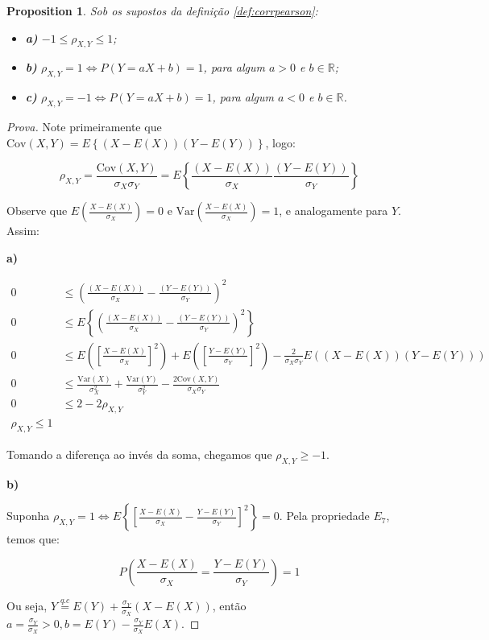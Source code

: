 \documentclass[
]{article}
\providecommand{\tightlist}{%
  \setlength{\itemsep}{0pt}\setlength{\parskip}{0pt}}
\newtheorem{proposition}{Proposition}[section]
\theoremstyle{definition}
\theoremstyle{definition}
\theoremstyle{definition}
\theoremstyle{definition}
\theoremstyle{remark}
\begin{document}
\begin{proposition}

Sob os supostos da definição \ref{def:corrpearson}:

\begin{itemize}
\tightlist
\item
  \textbf{a)} \(-1 \le \rho_{X,Y} \le 1\);
\item
  \textbf{b)} \(\rho_{X,Y} = 1 \Leftrightarrow P(Y = aX + b) = 1\), para algum \(a > 0\) e \(b \in \mathbb{R}\);
\item
  \textbf{c)} \(\rho_{X,Y} = -1 \Leftrightarrow P(Y = aX + b) = 1\), para algum \(a < 0\) e \(b \in \mathbb{R}\).
\end{itemize}

\end{proposition}

\begin{proof}[Prova]
Note primeiramente que \(\mathrm{Cov}(X,Y) = E\left\{(X - E(X))(Y - E(Y))\right\}\), logo:

\begin{equation*}
\rho_{X,Y} = \frac{\mathrm{Cov}(X,Y)}{\sigma_{X}\sigma_{Y}} = E\left\{\frac{(X - E(X))}{\sigma_{X}}\frac{(Y - E(Y))}{\sigma_{Y}}\right\}
\end{equation*}

Observe que \(E\left(\frac{X - E(X)}{\sigma_{X}}\right) = 0\) e \(\mathrm{Var}\left(\frac{X - E(X)}{\sigma_{X}}\right) = 1\), e analogamente para \(Y\). Assim:

\textbf{a)}

\begin{align*}
0 &\le \left(\frac{(X - E(X))}{\sigma_{X}} - \frac{(Y - E(Y))}{\sigma_{Y}}\right)^{2} \\
0 &\le E\left\{\left(\frac{(X - E(X))}{\sigma_{X}} - \frac{(Y - E(Y))}{\sigma_{Y}}\right)^{2}\right\} \\
0 &\le E\left(\left[\frac{X - E(X)}{\sigma_{X}}\right]^{2}\right) + E\left(\left[\frac{Y - E(Y)}{\sigma_{Y}}\right]^{2}\right) - \frac{2}{\sigma_{X}\sigma_{Y}}E((X - E(X))(Y - E(Y))) \\
0 &\le \frac{\mathrm{Var}(X)}{\sigma_{X}^{2}} + \frac{\mathrm{Var}(Y)}{\sigma_{Y}^{2}} - \frac{2\mathrm{Cov}(X,Y)}{\sigma_{X}\sigma_{Y}} \\
0 &\le 2 - 2\rho_{X,Y} \\
\rho_{X,Y} \le 1
\end{align*}

Tomando a diferença ao invés da soma, chegamos que \(\rho_{X,Y} \ge -1\).

\textbf{b)}

Suponha \(\rho_{X,Y} = 1 \Leftrightarrow E\left\{\left[\frac{X - E(X)}{\sigma_{X}} - \frac{Y - E(Y)}{\sigma_{Y}}\right]^{2}\right\} = 0\). Pela propriedade \(E_{7}\), temos que:

\begin{equation*}
P\left(\frac{X - E(X)}{\sigma_{X}} = \frac{Y - E(Y)}{\sigma_{Y}}\right) = 1
\end{equation*}

Ou seja, \(Y \stackrel{q.c}{=} E(Y) + \frac{\sigma_{Y}}{\sigma_{X}}(X - E(X))\), então \(a = \frac{\sigma_{Y}}{\sigma_{X}}>0, b = E(Y) - \frac{\sigma_{Y}}{\sigma_{X}}E(X)\).
\end{proof}
\end{document}
